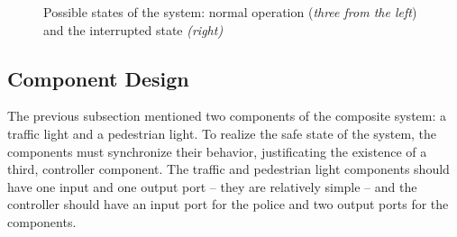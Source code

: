 \begin{figure}[!ht] 
	\centering
	\caption{Possible states of the system: normal operation (\textit{three from the left}) and the interrupted state \textit{(right)}} 
	\label{fig_casestudy_systemstates}
\end{figure}

\subsection{Component Design} \label{subs_casestudycomps}

The previous subsection mentioned two components of the composite system: a traffic light and a pedestrian light. To realize the safe state of the system, the components must synchronize their behavior, justificating the existence of a third, controller component. The traffic and pedestrian light components should have one input and one output port -- they  are relatively simple -- and the controller should have an input port for the police and two output ports for the components.

